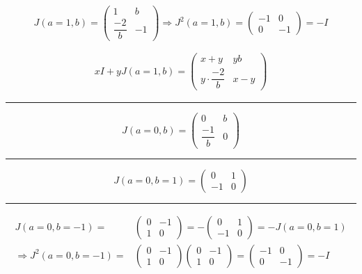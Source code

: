 \documentclass[
]{book}
\theoremstyle{definition}
\theoremstyle{definition}
\theoremstyle{definition}
\theoremstyle{definition}
\theoremstyle{remark}
\begin{document}
\[
J\left(a=1,b\right)=\begin{pmatrix}1 & b\\
\dfrac{-2}{b} & -1
\end{pmatrix}\Rightarrow J^{2}\left(a=1,b\right)=\begin{pmatrix}-1 & 0\\
0 & -1
\end{pmatrix}=-I
\]

\[
\begin{aligned}
xI+yJ\left(a=1,b\right)=\begin{pmatrix}x+y & yb\\
y\cdot\dfrac{-2}{b} & x-y
\end{pmatrix}
\end{aligned}
\]

\begin{center}\rule{0.5\linewidth}{0.5pt}\end{center}

\[
J\left(a=0,b\right)=\begin{pmatrix}0 & b\\
\dfrac{-1}{b} & 0
\end{pmatrix}
\]

\begin{center}\rule{0.5\linewidth}{0.5pt}\end{center}

\[
J\left(a=0,b=1\right)=\begin{pmatrix}0 & 1\\
-1 & 0
\end{pmatrix}
\]

\begin{center}\rule{0.5\linewidth}{0.5pt}\end{center}

\[
\begin{aligned}
J\left(a=0,b=-1\right)= & \begin{pmatrix}0 & -1\\
1 & 0
\end{pmatrix}=-\begin{pmatrix}0 & 1\\
-1 & 0
\end{pmatrix}=-J\left(a=0,b=1\right)\\
\Rightarrow J^{2}\left(a=0,b=-1\right)= & \begin{pmatrix}0 & -1\\
1 & 0
\end{pmatrix}\begin{pmatrix}0 & -1\\
1 & 0
\end{pmatrix}=\begin{pmatrix}-1 & 0\\
0 & -1
\end{pmatrix}=-I
\end{aligned}
\]
\end{document}
